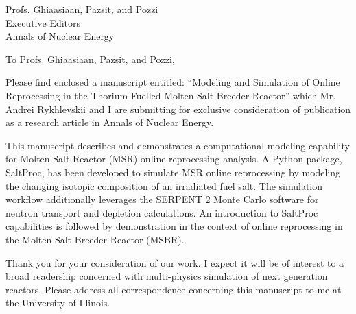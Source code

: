 \documentclass[11pt]{letter} %
\newcommand{\RecipientName}{Profs. Ghiaasiaan, Pazsit, and Pozzi\xspace}
\newcommand{\RecipientAddress}{Executive Editors\\Annals of Nuclear Energy}
\begin{document}



\begin{letter}{\RecipientName\\
        \RecipientAddress\xspace}

\address{Kathryn D. Huff\\
kdhuff@illinois.edu\\
118 Talbot Laboratory\\
104 Wright Street\\
MC-234\\
Urbana, IL 61801}


\opening{To \RecipientName,}

Please find enclosed a manuscript entitled: ``Modeling and Simulation of Online
Reprocessing in the Thorium-Fuelled Molten Salt Breeder Reactor'' which Mr. 
Andrei Rykhlevskii and I are submitting for exclusive consideration of 
publication as a research article in Annals of Nuclear Energy.

This manuscript describes and demonstrates a computational modeling capability
for Molten Salt Reactor (MSR) online reprocessing analysis.  A Python package,
SaltProc, has been developed to simulate MSR online reprocessing by modeling
the changing isotopic composition of an irradiated fuel salt. The simulation
workflow additionally leverages the SERPENT 2 Monte Carlo software for neutron
transport and depletion calculations. An introduction to SaltProc capabilities
is followed by demonstration in the context of online reprocessing in the
Molten Salt Breeder Reactor (MSBR).  

Thank you for your consideration of our work.  I expect it will be of interest
to a broad readership concerned with multi-physics simulation of next generation
reactors.  Please address all correspondence concerning this manuscript to me at the University of Illinois.




\end{letter}
\end{document}
